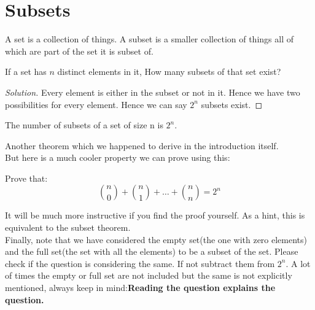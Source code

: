 \section{Subsets}
A set is a collection of things. A subset is a smaller collection of things all of which are part of the set it is subset of.\\
\begin{example}
    If a set has $n$ distinct elements in it, How many subsets of that set exist?
\end{example}
\begin{proof}
    [Solution]
    Every element is either in the subset or not in it. Hence we have two possibilities for every element. Hence we can say $2^n$ subsets exist.
\end{proof}
\begin{theorem}
    The number of subsets of a set of size n is $2^n$.
\end{theorem}
Another theorem which we happened to derive in the introduction itself.\\
But here is a much cooler property we can prove using this:\\
\begin{example}
    Prove that:\\
    \[
    \binom{n}{0}+\binom{n}{1}+\dots+\binom{n}{n}=2^n
    \]
\end{example}
It will be much more instructive if you find the proof yourself. As a hint, this is equivalent to the subset theorem.\\
Finally, note that we have considered the empty set(the one with zero elements) and the full set(the set with all the elements) to be a subset of the set. Please check if the question is considering the same. If not subtract them from $2^n$. A lot of times the empty or full set are not included but the same is not explicitly mentioned, always keep in mind:\textbf{Reading the question explains the question.}\\


